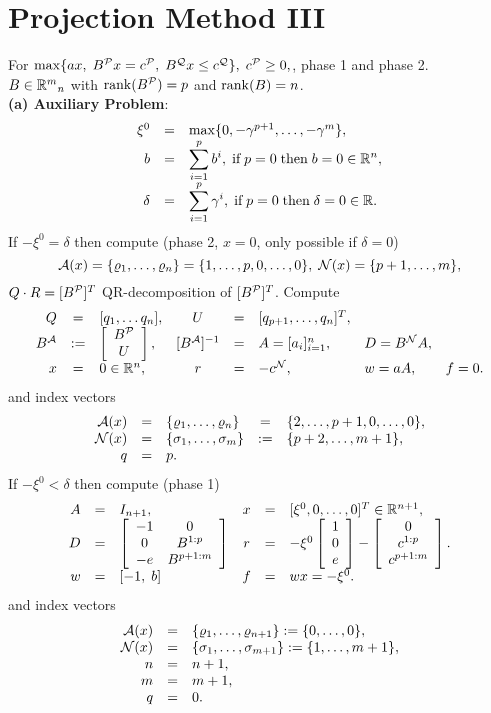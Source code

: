 \section{Projection Method III}
For $\max \{ax, \; B^{\P}x = c^{\P}, \; B^{\Q}x \leq c^{\Q}
\}, \; c^{\P} \geq 0,$, phase 1 and phase 2.\\
$B \in \Bbb{R}^m{}_n$ with $\rank (B^{\P}) = p$ and
$\rank (B) = n$.\\
{\bf (a) Auxiliary Problem}:
\[
\ba{.}{rcl}
\xi ^0  &=& \max\{0,-\gamma ^{p+1}, \ldots, -\gamma ^{m}\},\\
b       &=& \dis \sum_{i=1}^pb^i ,\; \mbox{if} \; p = 0 \; \mbox{then} \;
        b = 0 \in \Bbb{R}^n,\\
\delta  &=& \dis \sum_{i=1}^p\gamma ^i, \; \mbox{if} \; p = 0 \; \mbox{then}
            \; \delta  = 0 \in \Bbb{R}.
\ea{.}
\]
If $-\xi ^0 = \delta $ then compute (phase 2, $x = 0$, only possible if $\delta
= 0$)
%
\[
\A(x) = \{\rho _1,\ldots, \rho _n\} =  \{1, \ldots, p,0, \ldots, 0\}, \;
\N(x) = \{p + 1,\ldots ,m\},
\]
$Q \cdot R = [B^{\P}]^T$ QR-decomposition of $[B^{\P}]^T$. Compute
\[ \ba{.}{rclcllll}
Q       &=& [q_1,\ldots q_n], & U &=& [q_{p+1}, \ldots,q_n]^T,\\
 B^{\A} &:=& \ba{[}{c}B^{\P}\\ U\ea{]},
                      & [B^{\A}]^{-1} &=& A  = [a_i]_{i = 1}^n, &D = B^{\N}A,\\
x       &=& 0 \in \Bbb{R}^n, & r &=&  - c^{\N}, &w = aA, & f =  0.
\ea{.}
\]
and index vectors
\[ \ba{.}{rclcl}
\A(x) &=& \{\rho _1, \ldots, \rho _n\} &=& \{2,\ldots,p+1,0,
\ldots,0\},\\
\N(x) &=& \{\sigma _1, \ldots, \sigma _m\} &:=& \{p+2, \ldots, m+1\},\\
q &=& p.
\ea{.}
\]
%
If $-\xi ^0 < \delta $ then compute (phase 1)
\[ \ba{.}{rclcrl}
A &=& I_{n+1},            &         x &=& [\xi ^0,0, \ldots ,0]^T \in
\Bbb{R}^{n+1},\\
D &=& \ba{[}{cc} - 1     &   0      \\
                   0     & B^{1:p}  \\
                  -e     & B^{p+1:m} \ea{]}
&    r &=&  -\xi ^0\ba{[}{c}1 \\ 0       \\ e \ea{]}
                - \ba{[}{c}0 \\ c^{1:p} \\ c^{p+1:m} \ea{]}.\\
w &=& [-1, \; b] & f &=& wx = - \xi ^0.
\ea{.}
\]
and index vectors
\[ \ba{.} {rcl}
\A(x) &=&  \{\rho _1, \ldots, \rho _{n+1}\}    := \{0, \ldots, 0\},\\
\N(x) &=& \{\sigma _1, \ldots, \sigma _{m+1}\} := \{1, \ldots,m+1\},\\
      n &=& n+1,\\
      m &=& m+1,\\
      q &=& 0.
\ea{.}
\]
